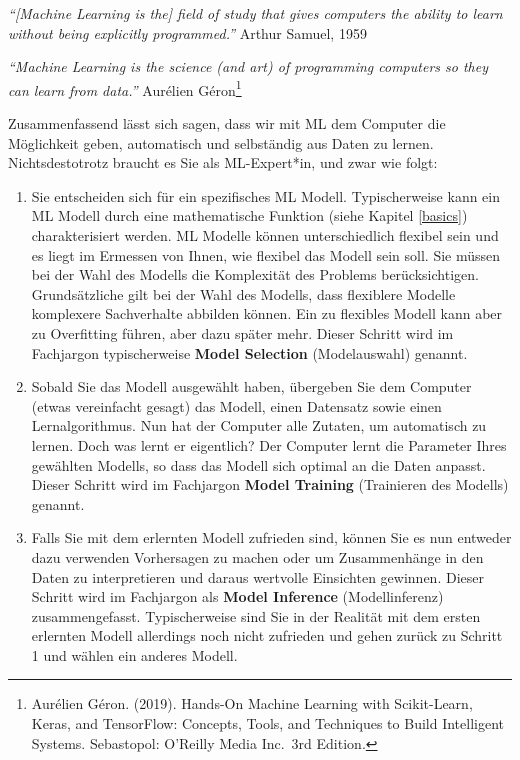 \documentclass[
]{book}
\providecommand{\tightlist}{%
  \setlength{\itemsep}{0pt}\setlength{\parskip}{0pt}}
\begin{document}
\emph{``{[}Machine Learning is the{]} field of study that gives computers the ability to learn without being explicitly programmed.''} Arthur Samuel, 1959

\emph{``Machine Learning is the science (and art) of programming computers so they can learn from data.''} Aurélien Géron\footnote{Aurélien Géron. (2019). Hands-On Machine Learning with Scikit-Learn, Keras, and TensorFlow: Concepts, Tools, and Techniques to Build Intelligent Systems. Sebastopol: O'Reilly Media Inc.~3rd Edition.}

Zusammenfassend lässt sich sagen, dass wir mit ML dem Computer die Möglichkeit geben, automatisch und selbständig aus Daten zu lernen. Nichtsdestotrotz braucht es Sie als ML-Expert*in, und zwar wie folgt:

\begin{enumerate}
\def\labelenumi{\arabic{enumi}.}
\tightlist
\item
  Sie entscheiden sich für ein spezifisches ML Modell. Typischerweise kann ein ML Modell durch eine mathematische Funktion (siehe Kapitel \ref{basics}) charakterisiert werden. ML Modelle können unterschiedlich flexibel sein und es liegt im Ermessen von Ihnen, wie flexibel das Modell sein soll. Sie müssen bei der Wahl des Modells die Komplexität des Problems berücksichtigen. Grundsätzliche gilt bei der Wahl des Modells, dass flexiblere Modelle komplexere Sachverhalte abbilden können. Ein zu flexibles Modell kann aber zu Overfitting führen, aber dazu später mehr. Dieser Schritt wird im Fachjargon typischerweise \textbf{Model Selection} (Modelauswahl) genannt.
\item
  Sobald Sie das Modell ausgewählt haben, übergeben Sie dem Computer (etwas vereinfacht gesagt) das Modell, einen Datensatz sowie einen Lernalgorithmus. Nun hat der Computer alle Zutaten, um automatisch zu lernen. Doch was lernt er eigentlich? Der Computer lernt die Parameter Ihres gewählten Modells, so dass das Modell sich optimal an die Daten anpasst. Dieser Schritt wird im Fachjargon \textbf{Model Training} (Trainieren des Modells) genannt.
\item
  Falls Sie mit dem erlernten Modell zufrieden sind, können Sie es nun entweder dazu verwenden Vorhersagen zu machen oder um Zusammenhänge in den Daten zu interpretieren und daraus wertvolle Einsichten gewinnen. Dieser Schritt wird im Fachjargon als \textbf{Model Inference} (Modellinferenz) zusammengefasst. Typischerweise sind Sie in der Realität mit dem ersten erlernten Modell allerdings noch nicht zufrieden und gehen zurück zu Schritt 1 und wählen ein anderes Modell.
\end{enumerate}
\end{document}
